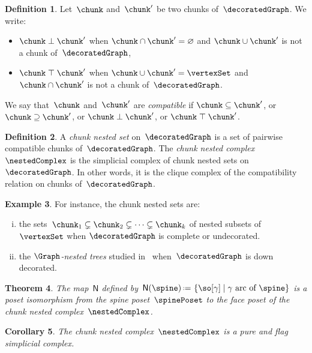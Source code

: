 \documentclass{amsart}
\newtheorem{theorem}{Theorem}[section]
\newtheorem{corollary}[theorem]{Corollary}
\theoremstyle{definition}
\newtheorem{definition}[theorem]{Definition}
\newtheorem{example}[theorem]{Example}
\newcommand{\set}[2]{\left\{ #1 \;\middle|\; #2 \right\}} %
\newcommand{\eqdef}{\mbox{\,\raisebox{0.2ex}{\scriptsize\ensuremath{\mathrm:}}\ensuremath{=}\,}} %
\newcommand{\darkblue}{\color{darkblue}} %
\newcommand{\defn}[1]{\textsl{\darkblue #1}} %
\newcommand{\negDisjoint}{\perp} %
\newcommand{\posDisjoint}{\;\top\;} %
\newcommand{\spineToNested}{\mathsf{N}} %
\begin{document}
\begin{definition}
  \label{def:compatibleBlocks}
  Let~$\chunk$ and~$\chunk'$ be two chunks of~$\decoratedGraph$.
  We write:
  \begin{itemize}
    \item $\chunk \negDisjoint \chunk'$ when $\chunk \cap \chunk' = \varnothing$ and $\chunk \cup \chunk'$ is not a chunk of~$\decoratedGraph$,
    \item $\chunk \posDisjoint \chunk'$ when $\chunk \cup \chunk' = \vertexSet$ and~$\chunk \cap \chunk'$ is not a chunk of~$\decoratedGraph$.
  \end{itemize}
  We say that~$\chunk$ and~$\chunk'$ are \defn{compatible} if $\chunk \subseteq \chunk'$, or $\chunk \supseteq \chunk'$, or $\chunk \negDisjoint \chunk'$, or $\chunk \posDisjoint \chunk'$.
\end{definition}

\begin{definition}
  \label{def:nestedComplex}
  A \defn{chunk nested set} on~$\decoratedGraph$ is a set of pairwise compatible chunks of~$\decoratedGraph$.
  The \defn{chunk nested complex}~$\nestedComplex$ is the simplicial complex of chunk nested sets on~$\decoratedGraph$.
  In other words, it is the clique complex of the compatibility relation on chunks of~$\decoratedGraph$.
\end{definition}

\begin{example}
  \label{exm:nestedComplex}
  For instance, the chunk nested sets are:
  \begin{enumerate}[(i)]
    \item the sets~$\chunk_1 \subsetneq \chunk_2 \subsetneq \dots \subsetneq \chunk_k$ of nested subsets of~$\vertexSet$ when $\decoratedGraph$ is complete or undecorated.
    \item the \defn{$\Graph$-nested trees} studied in~\cite{CarrDevadoss} when~$\decoratedGraph$ is down decorated.
  \end{enumerate}
\end{example}

\begin{theorem}
  \label{thm:spineToNested}
  The map~$\spineToNested$ defined by~$\spineToNested(\spine) \eqdef \set{\so[\gamma]}{\gamma \text{ arc of } \spine}$ is a poset isomorphism from the spine poset~$\spinePoset$ to the face poset of the chunk nested complex~$\nestedComplex$.
\end{theorem}

\begin{corollary}
  The chunk nested complex~$\nestedComplex$ is a pure and flag simplicial complex.
\end{corollary}
\end{document}

